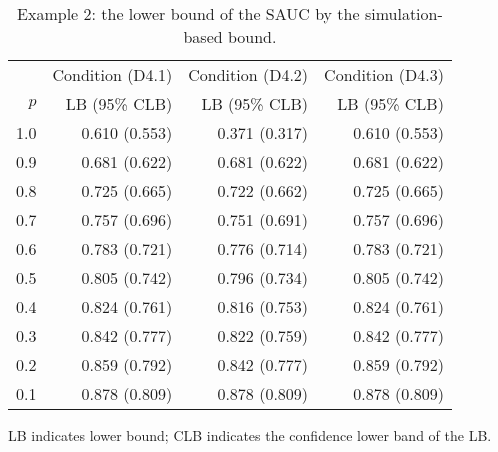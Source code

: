 \begin{table}

\caption{\label{tab:tab2}Example 2: the lower bound of the SAUC by the simulation-based bound.}
\centering
\begin{threeparttable}
\begin{tabular}[t]{rrrr}
\toprule
\multicolumn{1}{c}{} & \multicolumn{1}{c}{Condition (D4.1)} & \multicolumn{1}{c}{Condition (D4.2)} & \multicolumn{1}{c}{Condition (D4.3)} \\
\cmidrule(l{3pt}r{3pt}){2-2} \cmidrule(l{3pt}r{3pt}){3-3} \cmidrule(l{3pt}r{3pt}){4-4}
$p$ & LB (95\% CLB) & LB (95\% CLB) & LB (95\% CLB)\\
\midrule
1.0 & 0.610 (0.553) & 0.371 (0.317) & 0.610 (0.553)\\
0.9 & 0.681 (0.622) & 0.681 (0.622) & 0.681 (0.622)\\
0.8 & 0.725 (0.665) & 0.722 (0.662) & 0.725 (0.665)\\
0.7 & 0.757 (0.696) & 0.751 (0.691) & 0.757 (0.696)\\
0.6 & 0.783 (0.721) & 0.776 (0.714) & 0.783 (0.721)\\
0.5 & 0.805 (0.742) & 0.796 (0.734) & 0.805 (0.742)\\
0.4 & 0.824 (0.761) & 0.816 (0.753) & 0.824 (0.761)\\
0.3 & 0.842 (0.777) & 0.822 (0.759) & 0.842 (0.777)\\
0.2 & 0.859 (0.792) & 0.842 (0.777) & 0.859 (0.792)\\
0.1 & 0.878 (0.809) & 0.878 (0.809) & 0.878 (0.809)\\
\bottomrule
\end{tabular}
\begin{tablenotes}
\item 
           LB indicates lower bound; CLB indicates the confidence lower band of the LB.
\end{tablenotes}
\end{threeparttable}
\end{table}

